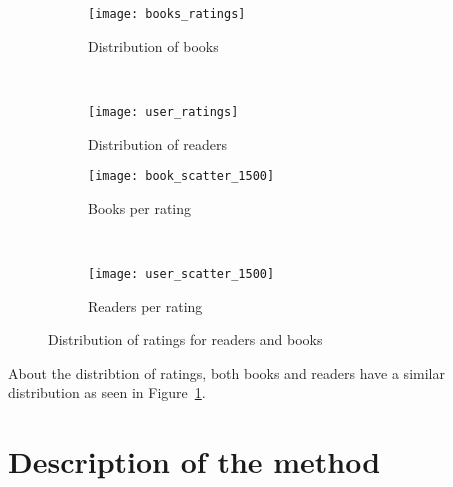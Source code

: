 \documentclass[11pt]{article}
\begin{document}





\begin{figure}
        \centering
        \begin{subfigure}[b]{0.5\textwidth}
                \texttt{[image: books\_ratings]}
                \caption{Distribution of books}
        \end{subfigure}%
        ~ %
        \begin{subfigure}[b]{0.5\textwidth}
                \texttt{[image: user\_ratings]}
                \caption{Distribution of readers}
        \end{subfigure}

        \begin{subfigure}[b]{0.5\textwidth}
                \texttt{[image: book\_scatter\_1500]}
                \caption{Books per rating}
        \end{subfigure}%
        ~ %
        \begin{subfigure}[b]{0.5\textwidth}
                \texttt{[image: user\_scatter\_1500]}
                \caption{Readers per rating}
        \end{subfigure}
        \caption{Distribution of ratings for readers and books}
        \label{fig:scatters}
\end{figure}

About the distribtion of ratings, both books and readers have a similar distribution as seen in Figure~\ref{fig:scatters}.


\section{Description of the method}
\label{sec:method}
\end{document}
